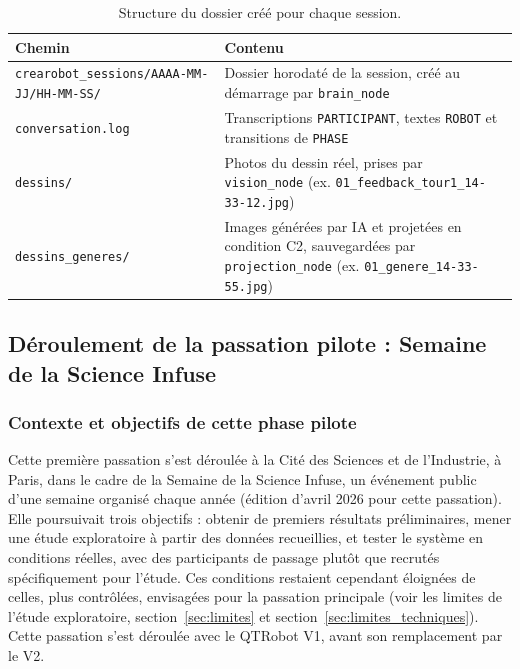 \documentclass[11pt]{article}
\begin{document}
\begin{table}[H]
    \centering
    \renewcommand{\arraystretch}{1.6}
    \begin{tabular}{@{}lp{8.5cm}@{}}
        \toprule
        \textbf{Chemin} & \textbf{Contenu} \\
        \midrule
        \texttt{crearobot\_sessions/AAAA-MM-JJ/HH-MM-SS/} & Dossier horodaté de la session, créé au démarrage par \texttt{brain\_node} \\
        \texttt{conversation.log} & Transcriptions \texttt{PARTICIPANT}, textes \texttt{ROBOT} et transitions de \texttt{PHASE} \\
        \texttt{dessins/} & Photos du dessin réel, prises par \texttt{vision\_node} (ex. \texttt{01\_feedback\_tour1\_14-33-12.jpg}) \\
        \texttt{dessins\_generes/} & Images générées par IA et projetées en condition C2, sauvegardées par \texttt{projection\_node} (ex. \texttt{01\_genere\_14-33-55.jpg}) \\
        \bottomrule
    \end{tabular}
    \renewcommand{\arraystretch}{1}
    \caption{Structure du dossier créé pour chaque session.}
    \label{tab:session_structure}
\end{table}

\newpage

\subsection{Déroulement de la passation pilote : Semaine de la Science Infuse}
\label{sec:scienceinfuse}

\subsubsection{Contexte et objectifs de cette phase pilote}

Cette première passation s'est déroulée à la Cité des Sciences et de l'Industrie, à Paris, dans le cadre de la Semaine de la Science Infuse, un événement public d'une semaine organisé chaque année (édition d'avril 2026 pour cette passation). Elle poursuivait trois objectifs : obtenir de premiers résultats préliminaires, mener une étude exploratoire à partir des données recueillies, et tester le système en conditions réelles, avec des participants de passage plutôt que recrutés spécifiquement pour l'étude. Ces conditions restaient cependant éloignées de celles, plus contrôlées, envisagées pour la passation principale (voir les limites de l'étude exploratoire, section~\ref{sec:limites} et section~\ref{sec:limites_techniques}). Cette passation s'est déroulée avec le QTRobot V1, avant son remplacement par le V2.
\end{document}
